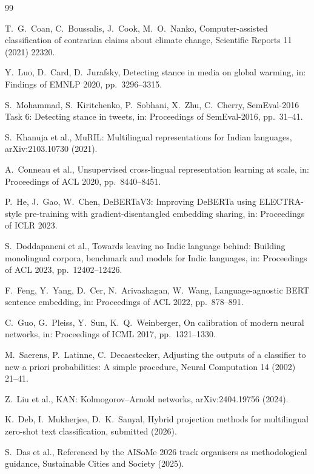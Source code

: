 \documentclass[twocolumn]{ceurart}
\begin{document}
\begin{thebibliography}{99}

T.\ G.\ Coan, C.\ Boussalis, J.\ Cook, M.\ O.\ Nanko,
Computer-assisted classification of contrarian claims about climate change,
Scientific Reports 11 (2021) 22320.

Y.\ Luo, D.\ Card, D.\ Jurafsky,
Detecting stance in media on global warming,
in: Findings of EMNLP 2020, pp.\ 3296--3315.

S.\ Mohammad, S.\ Kiritchenko, P.\ Sobhani, X.\ Zhu, C.\ Cherry,
SemEval-2016 Task 6: Detecting stance in tweets,
in: Proceedings of SemEval-2016, pp.\ 31--41.

S.\ Khanuja et al.,
MuRIL: Multilingual representations for Indian languages,
arXiv:2103.10730 (2021).

A.\ Conneau et al.,
Unsupervised cross-lingual representation learning at scale,
in: Proceedings of ACL 2020, pp.\ 8440--8451.

P.\ He, J.\ Gao, W.\ Chen,
DeBERTaV3: Improving DeBERTa using ELECTRA-style pre-training with
gradient-disentangled embedding sharing,
in: Proceedings of ICLR 2023.

S.\ Doddapaneni et al.,
Towards leaving no Indic language behind: Building monolingual corpora,
benchmark and models for Indic languages,
in: Proceedings of ACL 2023, pp.\ 12402--12426.

F.\ Feng, Y.\ Yang, D.\ Cer, N.\ Arivazhagan, W.\ Wang,
Language-agnostic BERT sentence embedding,
in: Proceedings of ACL 2022, pp.\ 878--891.

C.\ Guo, G.\ Pleiss, Y.\ Sun, K.\ Q.\ Weinberger,
On calibration of modern neural networks,
in: Proceedings of ICML 2017, pp.\ 1321--1330.

M.\ Saerens, P.\ Latinne, C.\ Decaestecker,
Adjusting the outputs of a classifier to new a priori probabilities:
A simple procedure,
Neural Computation 14 (2002) 21--41.

Z.\ Liu et al.,
KAN: Kolmogorov--Arnold networks,
arXiv:2404.19756 (2024).

K.\ Deb, I.\ Mukherjee, D.\ K.\ Sanyal,
Hybrid projection methods for multilingual zero-shot text classification,
submitted (2026).

S.\ Das et al.,
Referenced by the AISoMe 2026 track organisers as methodological guidance,
Sustainable Cities and Society (2025).

\end{thebibliography}
\end{document}
